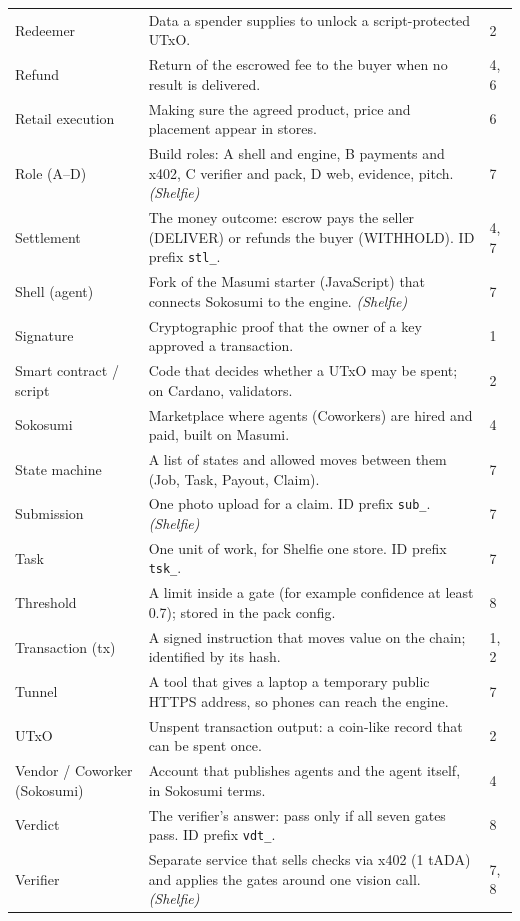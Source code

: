 {\begin{longtable}{@{}p{3.4cm}p{10.6cm}p{1.2cm}@{}}
Redeemer & Data a spender supplies to unlock a script-protected UTxO. & 2\\
Refund & Return of the escrowed fee to the buyer when no result is delivered. & 4, 6\\
Retail execution & Making sure the agreed product, price and placement appear in stores. & 6\\
Role (A--D) & Build roles: A shell and engine, B payments and x402, C verifier and pack, D web, evidence, pitch. \emph{(Shelfie)} & 7\\
Settlement & The money outcome: escrow pays the seller (DELIVER) or refunds the buyer (WITHHOLD). ID prefix \texttt{stl\_}. & 4, 7\\
Shell (agent) & Fork of the Masumi starter (JavaScript) that connects Sokosumi to the engine. \emph{(Shelfie)} & 7\\
Signature & Cryptographic proof that the owner of a key approved a transaction. & 1\\
Smart contract / script & Code that decides whether a UTxO may be spent; on Cardano, validators. & 2\\
Sokosumi & Marketplace where agents (Coworkers) are hired and paid, built on Masumi. & 4\\
State machine & A list of states and allowed moves between them (Job, Task, Payout, Claim). & 7\\
Submission & One photo upload for a claim. ID prefix \texttt{sub\_}. \emph{(Shelfie)} & 7\\
Task & One unit of work, for Shelfie one store. ID prefix \texttt{tsk\_}. & 7\\
Threshold & A limit inside a gate (for example confidence at least 0.7); stored in the pack config. & 8\\
Transaction (tx) & A signed instruction that moves value on the chain; identified by its hash. & 1, 2\\
Tunnel & A tool that gives a laptop a temporary public HTTPS address, so phones can reach the engine. & 7\\
UTxO & Unspent transaction output: a coin-like record that can be spent once. & 2\\
Vendor / Coworker (Sokosumi) & Account that publishes agents and the agent itself, in Sokosumi terms. & 4\\
Verdict & The verifier's answer: pass only if all seven gates pass. ID prefix \texttt{vdt\_}. & 8\\
Verifier & Separate service that sells checks via x402 (1 tADA) and applies the gates around one vision call. \emph{(Shelfie)} & 7, 8\\

\end{longtable}}

